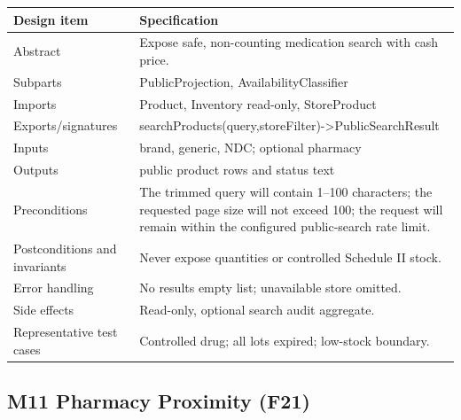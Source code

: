 {\def\LTcaptype{none} %
\begin{longtable}[]{|
  >{\raggedright\arraybackslash}m{}|
  >{\raggedright\arraybackslash}m{}|}
\hline
\begin{minipage}[c]{\linewidth}\raggedright
\textbf{Design item}
\end{minipage} & \begin{minipage}[c]{\linewidth}\raggedright
\textbf{Specification}
\end{minipage} \\
\hline
\endhead

\endlastfoot
Abstract & Expose safe, non-counting medication search with cash price. \\ \hline
Subparts & PublicProjection, AvailabilityClassifier \\ \hline
Imports & Product, Inventory read-only, StoreProduct \\ \hline
Exports/signatures & searchProducts(query,storeFilter)-\textgreater PublicSearchResult \\ \hline
Inputs & brand, generic, NDC; optional pharmacy \\ \hline
Outputs & public product rows and status text \\ \hline
Preconditions & The trimmed query will contain 1--100 characters; the requested page size will not exceed 100; the request will remain within the configured public-search rate limit. \\ \hline
Postconditions and invariants & Never expose quantities or controlled Schedule II stock. \\ \hline
Error handling & No results empty list; unavailable store omitted. \\ \hline
Side effects & Read-only, optional search audit aggregate. \\ \hline
Representative test cases & Controlled drug; all lots expired; low-stock boundary. \\ \hline
\end{longtable}
}

\subsection{M11 Pharmacy Proximity (F21)}\label{m11-pharmacy-proximity-f21}

